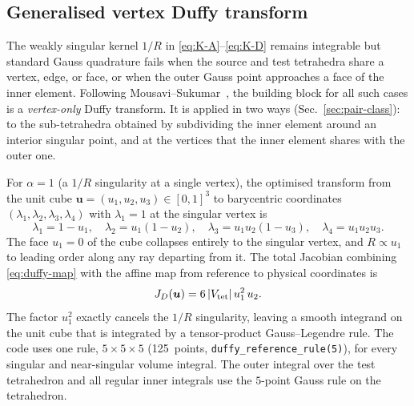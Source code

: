\documentclass[11pt,a4paper]{article}
\begin{document}
\subsection{Generalised vertex Duffy transform}
\label{sec:duffy-vertex}

The weakly singular kernel $1/R$ in \eqref{eq:K-A}--\eqref{eq:K-D}
remains integrable but standard Gauss quadrature fails when the source
and test tetrahedra share a vertex, edge, or face, or when the outer
Gauss point approaches a face of the inner element. Following
Mousavi--Sukumar~\cite{MousaviSukumar2010}, the building block for all
such cases is a \emph{vertex-only} Duffy transform. It is applied in
two ways (Sec.~\ref{sec:pair-class}): to the sub-tetrahedra obtained by
subdividing the inner element around an interior singular point, and
at the vertices that the inner element shares with the outer one.

For $\alpha = 1$ (a $1/R$ singularity at a single vertex), the
optimised transform from the unit cube
$\bm{u}=(u_1,u_2,u_3)\in[0,1]^{3}$ to barycentric coordinates
$(\lambda_1,\lambda_2,\lambda_3,\lambda_4)$ with $\lambda_1 = 1$ at the
singular vertex is~\cite[Eq.~(1) with $\beta=1$]{MousaviSukumar2010}
\begin{equation}
  \lambda_1 = 1 - u_1,\quad
  \lambda_2 = u_1(1-u_2),\quad
  \lambda_3 = u_1 u_2 (1-u_3),\quad
  \lambda_4 = u_1 u_2 u_3.
  \label{eq:duffy-map}
\end{equation}
The face $u_1 = 0$ of the cube collapses entirely to the singular
vertex, and $R \propto u_1$ to leading order along any ray departing
from it. The total Jacobian combining \eqref{eq:duffy-map} with the
affine map from reference to physical coordinates is
\begin{equation}
  J_{D}(\bm{u}) = 6\,\abs{V_{\text{tet}}}\,u_1^{2}\,u_2.
  \label{eq:duffy-jacobian}
\end{equation}
The factor $u_1^{2}$ exactly cancels the $1/R$ singularity, leaving a
smooth integrand on the unit cube that is integrated by a tensor-product
Gauss--Legendre rule. The code uses one rule, $5\times 5\times 5$
(125~points, \texttt{duffy\_reference\_rule(5)}), for every singular and
near-singular volume integral. The outer integral over the test
tetrahedron and all regular inner integrals use the $5$-point Gauss rule
on the tetrahedron.

\end{document}
